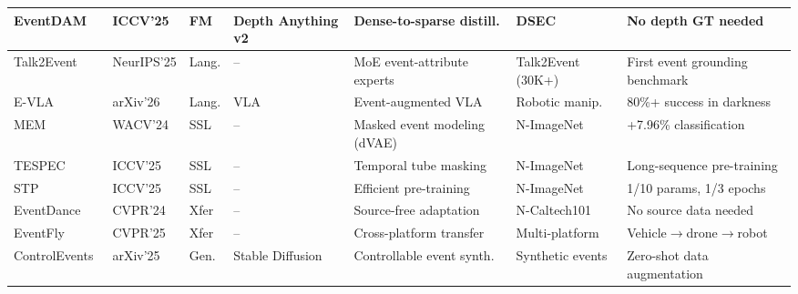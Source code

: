 \begin{table}[t]
{\begin{tabular}{lllllll}
EventDAM~\cite{xu2025depthanycvent}     & ICCV'25  & FM    & Depth Anything v2 & Dense-to-sparse distill. & DSEC               & No depth GT needed \\
\midrule
Talk2Event~\cite{zheng2025talk2event}   & NeurIPS'25 & Lang. & --         & MoE event-attribute experts  & Talk2Event (30K+)  & First event grounding benchmark \\
E-VLA~\cite{miao2026evla}              & arXiv'26 & Lang. & VLA          & Event-augmented VLA          & Robotic manip.     & 80\%+ success in darkness \\
\midrule
MEM~\cite{klenk2024mem}                & WACV'24  & SSL   & --           & Masked event modeling (dVAE) & N-ImageNet         & +7.96\% classification \\
TESPEC                                   & ICCV'25  & SSL   & --           & Temporal tube masking         & N-ImageNet         & Long-sequence pre-training \\
STP                                      & ICCV'25  & SSL   & --           & Efficient pre-training        & N-ImageNet         & 1/10 params, 1/3 epochs \\
\midrule
EventDance~\cite{zheng2024eventdance}   & CVPR'24  & Xfer  & --           & Source-free adaptation        & N-Caltech101       & No source data needed \\
EventFly~\cite{kong2025eventfly}        & CVPR'25  & Xfer  & --           & Cross-platform transfer       & Multi-platform     & Vehicle$\rightarrow$drone$\rightarrow$robot \\
\midrule
ControlEvents~\cite{wu2025controlevents} & arXiv'25 & Gen. & Stable Diffusion & Controllable event synth. & Synthetic events   & Zero-shot data augmentation \\
\bottomrule
\end{tabular}
}
\end{table}
